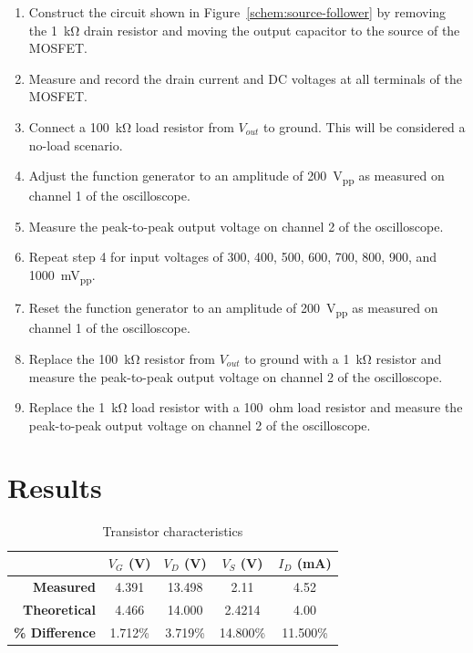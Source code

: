 \begin{enumerate}
\item Construct the circuit shown in Figure~\ref{schem:source-follower} by removing the \SI{1}{\kilo\ohm} drain resistor and moving the output capacitor to the source of the MOSFET.
\item Measure and record the drain current and DC voltages at all terminals of the MOSFET.
\item Connect a \SI{100}{\kilo\ohm} load resistor from $V_{out}$ to ground. This will be considered a no-load scenario.
\item Adjust the function generator to an amplitude of \SI{200}{V_{pp}} as measured on channel 1 of the oscilloscope.
\item Measure the peak-to-peak output voltage on channel 2 of the oscilloscope.
\item Repeat step 4 for input voltages of 300, 400, 500, 600, 700, 800, 900, and \SI{1000}{mV_{pp}}.
\item Reset the function generator to an amplitude of \SI{200}{V_{pp}} as measured on channel 1 of the oscilloscope.
\item Replace the \SI{100}{\kilo\ohm} resistor from $V_{out}$ to ground with a \SI{1}{\kilo\ohm} resistor and measure the peak-to-peak output voltage on channel 2 of the oscilloscope.
\item Replace the \SI{1}{\kilo\ohm} load resistor with a \SI{100}{ohm} load resistor and measure the peak-to-peak output voltage on channel 2 of the oscilloscope.
\end{enumerate}

\section{Results}

\begin{table}[hbtp]
  \centering
  \begin{tabular}{r|cccc}
                           & $V_{G}$ (\si{V}) & $V_{D}$ (\si{V}) & $V_{S}$ (\si{V}) & $I_D$ (\si{mA}) \\
    \hline
    \textbf{Measured}      & 4.391            & 13.498           & 2.11             & 4.52            \\
    \textbf{Theoretical}   & 4.466            & 14.000           & 2.4214           & 4.00            \\
    \textbf{\% Difference} & 1.712\%          & 3.719\%          & 14.800\%         & 11.500\%        \\
  \end{tabular}
  \caption{\label{tab:tran_common} Transistor characteristics}
\end{table}

